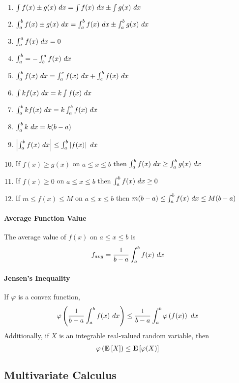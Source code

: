 \begin{enumerate}
	\item $\int f(x)\pm g(x)\ dx=\int f(x)\ dx\pm\int g(x)\ dx$
	\item $\int_a^b f(x)\pm g(x)\ dx=\int_a^b f(x)\ dx\pm\int_a^b g(x)\ dx$
	\item $\int_a^a f(x)\ dx=0$
	\item $\int_a^b=-\int_b^a f(x)\ dx$
	\item $\int_a^b f(x)\ dx=\int_a^c f(x)\ dx+\int_c^b f(x)\ dx$
	\item $\int kf(x)\ dx=k\int f(x)\ dx$
	\item $\int_a^b kf(x)\ dx=k\int_a^b f(x)\ dx$
	\item $\int_a^b k\ dx=k(b-a)$
	\item $\left\vert\int_a^b f(x)\ dx\right\vert\leq\int_a^b\left\vert f(x)\right\vert\ dx$
	\item If $f(x)\geq g(x)$ on $a\leq x\leq b$ then $\int_a^b f(x)\ dx\geq\int_a^b g(x)\ dx$
	\item If $f(x)\geq0$ on $a\leq x\leq b$ then $\int_a^b f(x)\ dx\geq0$
	\item If $m\leq f(x)\leq M$ on $a\leq x\leq b$ then $m(b-a)\leq\int_a^b f(x)\ dx\leq M(b-a)$
\end{enumerate}

\paragraph{Average Function Value}

The average value of $f(x)$ on $a\leq x\leq b$ is
\begin{align*}
	f_{avg}=\frac{1}{b-a}\int_a^b f(x)\ dx
\end{align*}

\paragraph{Jensen's Inequality}

If $\varphi$ is a convex function,
\begin{align*}
	\varphi\left(\frac{1}{b-a}\int_a^b f(x)\ dx\right)\leq\frac{1}{b-a}\int_a^b\varphi\left(f(x)\right)\ dx
\end{align*}
Additionally, if $X$ is an integrable real-valued random variable, then
\begin{align*}
	\varphi\left(\mathbf{E}\left[X\right]\right)\leq\mathbf{E}\left[\varphi(X)\right]
\end{align*}

\subsection{Multivariate Calculus}

